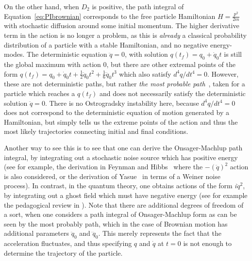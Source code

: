 \documentclass[aps,preprintnumbers,superscriptaddress,longbibliography]{revtex4-1}
\begin{document}
On the other hand, when $D_2$ is positive, the path integral of Equation~\eqref{eq:PIbrownian} corresponds to the free particle Hamiltonian $H=\frac{p^2}{2m}$ with stochastic diffusion around some initial momentum. %
The higher derivative term in the action is no longer a problem, as this is {\it already} a classical probability distribution of a particle with a stable Hamiltonian, and no negative energy-modes. 
The deterministic equation $\ddot{q}=0$, with solution 
 $   q(t_f)=q_0+\dot{q}_0t
 $
is still the global maximum with action $0$, but there are other extremal points of the form $q(t_f)=q_0+\dot{q}_0t+\frac{1}{2}\ddot{q}_0 t^2+\frac{1}{6}\dddot{q}_0 t^3$ which also satisfy $d^4 q/dt^4=0$. However, these are not deterministic paths, but rather {\it the most probable path}~\cite{durr1978onsager,chao2019onsager}, taken for a particle which reaches a $q(t_f)$ and does not necessarily satisfy the deterministic solution $\ddot{q}=0$. %
There is no 
Ostrogradsky instability here, because $d^4 q/dt^4=0$ does not correspond to the deterministic equation of motion generated by a Hamiltonian, but simply tells us the extreme points of the action and thus the most likely trajectories connecting initial and final conditions.

Another way to see this is to see that one can derive the Onsager-Machlup path integral, by integrating out a stochastic noise source which has positive energy (see for example, the derivation in Feynman and Hibbs~\cite{feynman1965quantum} where the $-(\ddot{q})^2$ action is also considered, or the derivation of Yasue~\cite{yasue1978simple} in terms of a Weiner noise process). In contrast, in the quantum theory, one obtains actions of the form $i\ddot{q}^2$, by integrating out a ghost field which must have negative energy (see for example the pedagogical review in \cite{buchbinder2021introduction}). Note that there are additional degrees of freedom of a sort, when one considers a path integral of Onsager-Machlup form as can be seen by the most probably path, which in the case of Brownian motion has additional parameters $\ddot{q}_0$ and $\dddot{q}_0$. This merely represents the fact that the acceleration fluctuates, and thus specifying $q$ and $\dot{q}$ at $t=0$ is not enough to determine the trajectory of the particle. 
\end{document}
